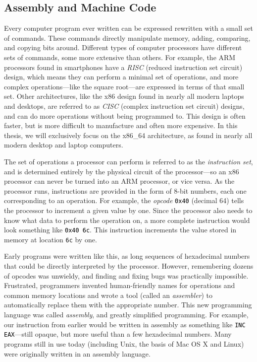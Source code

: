 \documentclass[12pt,twoside]{reedthesis}
\newcommand\code[1]{\colorbox{light-gray}{\texttt{\textcolor{black}{#1}}}}
\begin{document}
\subsection{Assembly and Machine Code}
Every computer program ever written can be expressed rewritten with a small set of commands. These commands directly manipulate memory, adding, comparing, and copying bits around. Different types of computer processors have different sets of commands, some more extensive than others. For example, the ARM processors found in smartphones have a \emph{RISC} (reduced instruction set circuit) design, which means they can perform a minimal set of operations, and more complex operations---like the square root---are expressed in terms of that small set. Other architectures, like the x86 design found in nearly all modern laptops and desktops, are referred to as \emph{CISC} (complex instruction set circuit) designs, and can do more operations without being programmed to. This design is often faster, but is more difficult to manufacture and often more expensive. In this thesis, we will exclusively focus on the x86\_64 architecture, as found in nearly all modern desktop and laptop computers.

The set of operations a processor can perform is referred to as the \emph{instruction set}, and is determined entirely by the physical circuit of the processor---so an x86 processor can never be turned into an ARM processor, or vice versa. As the processor runs, instructions are provided in the form of 8-bit numbers, each one corresponding to an operation. For example, the \emph{opcode} \code{0x40} (decimal 64) tells the processor to increment a given value by one. Since the processor also needs to know what data to perform the operation on, a more complete instruction would look something like \code{0x40 6c}. This instruction increments the value stored in memory at location \texttt{6c} by one.

Early programs were written like this, as long sequences of hexadecimal numbers that could be directly interpreted by the processor. However, remembering dozens of opcodes was unwieldy, and finding and fixing bugs was practically impossible. Frustrated, programmers invented human-friendly names for operations and common memory locations and wrote a tool (called an \emph{assembler}) to automatically replace them with the appropriate number. This new programming language was called \emph{assembly}, and greatly simplified programming. For example, our instruction from earlier would be written in assembly as something like \code{INC EAX}---still opaque, but more useful than a few hexadecimal numbers. Many programs still in use today (including Unix, the basis of Mac OS X and Linux) were originally written in an assembly language.
\end{document}
